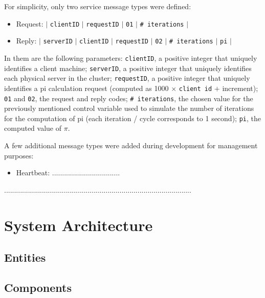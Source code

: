 \documentclass[12pt]{article}
\begin{document}
For simplicity, only two service message types were defined:
\vspace{-10pt}
\begin{itemize}[noitemsep]
  \item Request: $|$ \texttt{clientID} $|$ \texttt{requestID} $|$ \texttt{01} $|$ \texttt{\# iterations} $|$
  \item Reply: $|$ \texttt{serverID} $|$ \texttt{clientID} $|$ \texttt{requestID} $|$ \texttt{02} $|$ \texttt{\# iterations} $|$ \texttt{pi} $|$
\end{itemize}
\vspace{-10pt}
In them are the following parameters: 
\texttt{clientID}, a positive integer that uniquely identifies a client machine; 
\texttt{serverID}, a positive integer that uniquely identifies each physical server in the cluster;
\texttt{requestID}, a positive integer that uniquely identifies a pi calculation request (computed as 1000 $\times$ \texttt{client id} $+$ increment);
\texttt{01} and \texttt{02}, the request and reply codes;
\texttt{\# iterations}, the chosen value for the previously mentioned control variable used to simulate the number of iterations for the computation of pi
(each iteration / cycle corresponds to 1 second);
\texttt{pi}, the computed value of $\pi$.

A few additional message types were added during development for management purposes:
\vspace{-10pt}
\begin{itemize}[noitemsep]
  \item Heartbeat: ..................................
\end{itemize}
\vspace{-10pt}

..............................................................................................

\newpage
\section{System Architecture} \label{architecture} %


\subsection{Entities} \label{entitites} %


\subsection{Components} \label{components} %
\end{document}
